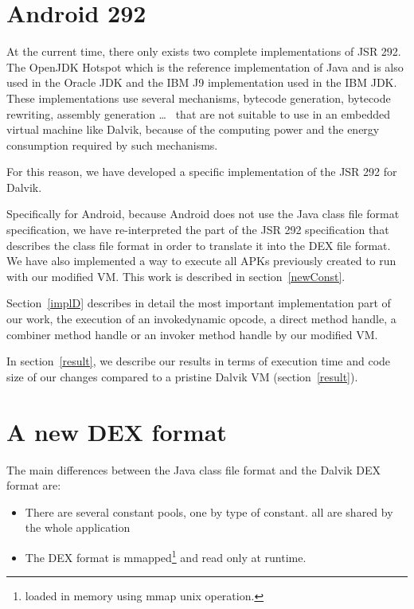 \documentclass{sig-alternate}
\def \DALVIK{Dalvik\xspace}
\def \Jsr{JSR\xspace}
\def \JSR{\Jsr 292\xspace}
\def \ANDROID{Android\xspace}
\begin{document}
\section{\ANDROID 292}
  At the current time, there only exists two complete implementations of \JSR.
  The OpenJDK Hotspot which is the reference implementation of Java and is also used in the Oracle JDK
  and the IBM J9 implementation used in the IBM JDK.
  These implementations use several mechanisms, bytecode generation, bytecode rewriting, assembly generation
  \dots~\cite{jvmsummit-heidinga-mhimpl-2010}\cite{jvmsummit-heidinga-mhimpl-2011}\cite{jvmsummit-rose-mhimpl-2011}
  that are not suitable to use in an embedded virtual machine like \DALVIK,
  because of the computing power and the energy consumption required by such mechanisms.

  For this reason, we have developed a specific implementation of the \JSR for \DALVIK.

  Specifically for \ANDROID, because \ANDROID does not use the Java class file format specification,
  we have re-interpreted the part of the \JSR specification that describes the class file format
  in order to translate it into the DEX file format.
  We have also implemented a way to execute all APKs previously created to run with our modified VM.
  This work is described in section~\ref{newConst}.
  
  Section~\ref{implD} describes in detail the most important implementation part of our work,
  the execution of an invokedynamic opcode, a direct method handle, a combiner method handle or
  an invoker method handle by our modified VM.
  
  In section~\ref{result}, we describe our results in terms of execution time and code size of our changes
  compared to a pristine Dalvik VM (section~\ref{result}).\\

\section{A new DEX format}
\label{newDEX}

  The main differences between the Java class file format and the Dalvik DEX format are:
  \begin{itemize}
   \item There are several constant pools, one by type of constant.
         all are shared by the whole application
   \item The DEX format is mmapped\footnote{loaded in memory using mmap unix operation.}
    and read only at runtime.
  \end{itemize}
  
\end{document}
